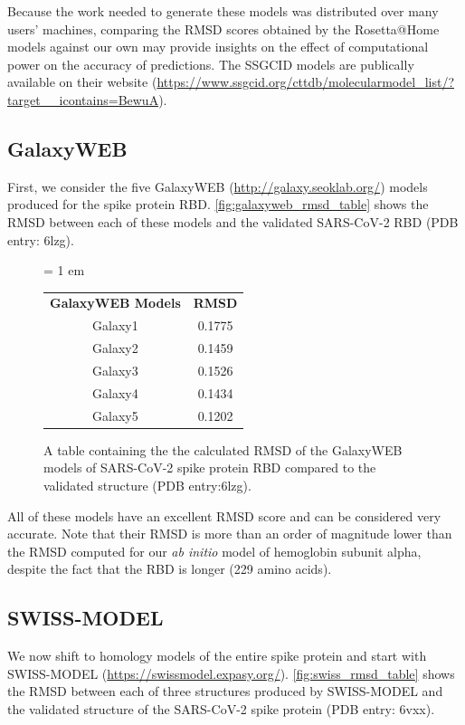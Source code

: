 Because the work needed to generate these models was distributed over many users' machines, comparing the RMSD scores obtained by the Rosetta@Home models against our own may provide insights on the effect of computational power on the accuracy of predictions. The SSGCID models are publically available on their website (\url{https://www.ssgcid.org/cttdb/molecularmodel_list/?target__icontains=BewuA}).

\FloatBarrier
{}
\subsection{GalaxyWEB}

First, we consider the five GalaxyWEB (\url{http://galaxy.seoklab.org/}) models produced for the spike protein RBD. \autoref{fig:galaxyweb_rmsd_table} shows the RMSD between each of these models and the validated SARS-CoV-2 RBD (PDB entry: 6lzg).\\

\begin{figure}[h]
	\centering
	\tabcolsep = 1 em
	\mySfFamily
	\begin{tabular}{c c}
		\textbf{GalaxyWEB Models} & \textbf{RMSD} \\
		Galaxy1 & 0.1775 \\
		Galaxy2 & 0.1459 \\
		Galaxy3 & 0.1526 \\
		Galaxy4 & 0.1434 \\
		Galaxy5 & 0.1202 \\
	\end{tabular}
	\caption{A table containing the the calculated RMSD of the GalaxyWEB models of SARS-CoV-2 spike protein RBD compared to the validated structure (PDB entry:6lzg).}
	\label{fig:galaxyweb_rmsd_table}
\end{figure}

All of these models have an excellent RMSD score and can be considered very accurate. Note that their RMSD is more than an order of magnitude lower than the RMSD computed for our \textit{ab initio} model of hemoglobin subunit alpha, despite the fact that the RBD is longer (229 amino acids).

\FloatBarrier
{}
\subsection{SWISS-MODEL}

We now shift to homology models of the entire spike protein and start with SWISS-MODEL (\url{https://swissmodel.expasy.org/}). \autoref{fig:swiss_rmsd_table} shows the RMSD between each of three structures produced by SWISS-MODEL and the validated structure of the SARS-CoV-2 spike protein (PDB entry: 6vxx).\\

